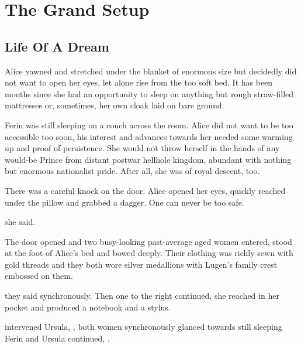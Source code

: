 \chapter{The Grand Setup}

\section{Life Of A Dream}

Alice yawned and stretched under the blanket of enormous size but decidedly did not want to open her eyes, let alone rise from the too soft bed. It has been months since she had an opportunity to sleep on anything but rough straw-filled mattresses or, sometimes, her own cloak laid on bare ground.

Ferin was still sleeping on a couch across the room. Alice did not want to be too accessible too soon, his interest and advances towards her needed some warming up and proof of persistence. She would not throw herself in the hands of any would-be Prince from distant postwar hellhole kingdom, abundant with nothing but enormous nationalist pride. After all, she was of royal descent, too.

There was a careful knock on the door. Alice opened her eyes, quickly reached under the pillow and grabbed a dagger. One can never be too safe.

 she said.

The door opened and two busy-looking past-average aged women entered, stood at the foot of Alice's bed and bowed deeply. Their clothing was richly sewn with gold threads and they both wore silver medallions with Lugen's family crest embossed on them.

 they said synchronously. Then one to the right continued,  she reached in her pocket and produced a notebook and a stylus. 

 intervened Ursula, , both women synchronously glanced towards still sleeping Ferin and Ursula continued, .

